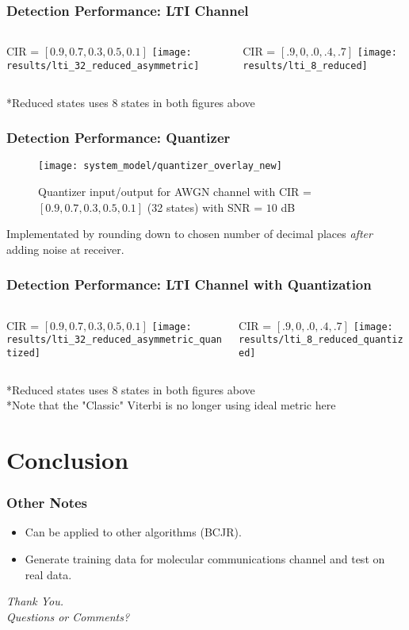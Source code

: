 \documentclass[10pt,tgadventor, onlymath]{beamer}
\begin{document}
\begin{frame}
\frametitle{Detection Performance: LTI Channel}
\begin{columns}
\begin{column}{0.5\linewidth}
\centering
CIR = $[0.9, 0.7, 0.3, 0.5, 0.1]$
	\texttt{[image: results/lti\_32\_reduced\_asymmetric]}
\end{column}
\begin{column}{0.5\linewidth}
\centering
CIR = $[.9, 0, .0, .4, .7]$
	\texttt{[image: results/lti\_8\_reduced]}
\end{column}
\end{columns}
*Reduced states uses 8 states in both figures above
\end{frame}
\begin{frame}
\frametitle{Detection Performance: Quantizer}
\begin{figure}
\texttt{[image: system\_model/quantizer\_overlay\_new]}
	\caption{Quantizer input/output for AWGN channel with CIR = $[ 0.9, 0.7, 0.3, 0.5, 0.1]$ (32 states) with SNR = $10$ dB}
\end{figure}
Implementated by rounding down to chosen number of decimal places \emph{after} adding noise at receiver. 
\end{frame}

\begin{frame}
\frametitle{Detection Performance: LTI Channel with Quantization}
\begin{columns}
\begin{column}{0.5\linewidth}
\centering
CIR = $[0.9, 0.7, 0.3, 0.5, 0.1]$
	\texttt{[image: results/lti\_32\_reduced\_asymmetric\_quantized]}
\end{column}
\begin{column}{0.5\linewidth}
\centering
CIR = $[.9, 0, .0, .4, .7]$
	\texttt{[image: results/lti\_8\_reduced\_quantized]}
\end{column}
\end{columns}

*Reduced states uses 8 states in both figures above
\\
*Note that the "Classic" Viterbi is no longer using ideal metric here
\end{frame}

\section{Conclusion}

\begin{frame}
\frametitle{Other Notes}
\begin{itemize}
\item Can be applied to other algorithms (BCJR).
\item Generate training data for molecular communications channel and test on real data.
\end{itemize}
\end{frame}

\begin{frame}
  \centering \Large
  \emph{Thank You.}
  \\
	\bigskip
    \centering \Large
  \emph{Questions or Comments?}
\end{frame}
\end{document}
